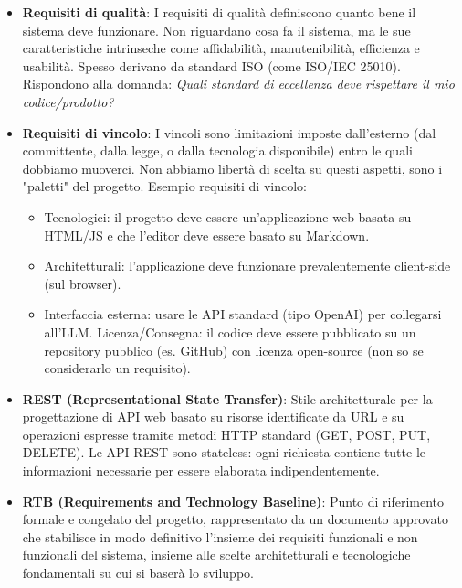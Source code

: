 \documentclass[11pt,a4paper]{article}
\begin{document}
\begin{itemize}
\item \textbf{Requisiti di qualità}: I requisiti di qualità definiscono quanto bene il sistema deve funzionare. Non riguardano cosa fa il sistema, ma le sue caratteristiche intrinseche come affidabilità, manutenibilità, efficienza e usabilità. Spesso derivano da standard ISO (come ISO/IEC 25010).
Rispondono alla domanda: \textit{Quali standard di eccellenza deve rispettare il mio codice/prodotto?}

\item \textbf{Requisiti di vincolo}: I vincoli sono limitazioni imposte dall'esterno (dal committente, dalla legge, o dalla tecnologia disponibile) entro le quali dobbiamo muoverci. Non abbiamo libertà di scelta su questi aspetti, sono i "paletti" del progetto.
Esempio requisiti di vincolo:
\begin{itemize}
\item Tecnologici: il progetto deve essere un'applicazione web basata su HTML/JS e che l'editor deve essere basato su Markdown. 
\item Architetturali: l'applicazione deve funzionare prevalentemente client-side (sul browser).
\item Interfaccia esterna: usare le API standard (tipo OpenAI) per collegarsi all'LLM.
Licenza/Consegna: il codice deve essere pubblicato su un repository pubblico (es. GitHub) con licenza open-source (non so se considerarlo un requisito).
\end{itemize}

\item \textbf{REST (Representational State Transfer)}: Stile architetturale per la progettazione di API web basato su risorse identificate da URL e su operazioni espresse tramite metodi HTTP standard (GET, POST, PUT, DELETE). Le API REST sono stateless: ogni richiesta contiene tutte le informazioni necessarie per essere elaborata indipendentemente.

\item \textbf{RTB (Requirements and Technology Baseline)}: Punto di riferimento formale e congelato del progetto, rappresentato da un documento approvato che stabilisce in modo definitivo l’insieme dei requisiti funzionali e non funzionali del sistema, insieme alle scelte architetturali e tecnologiche fondamentali su cui si baserà lo sviluppo. 
\end{itemize}
\newpage
\end{document}
